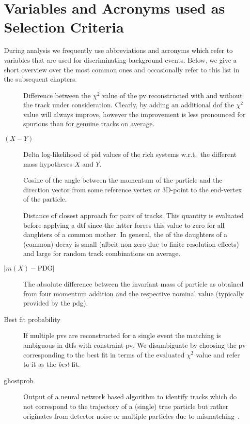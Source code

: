 \section{Variables and Acronyms used as Selection Criteria}
\label{sec:selvar}
During analysis we frequently use abbreviations and acronyms which refer to variables that are used for discriminating background events.
Below, we give a short overview over the most common ones and occasionally refer to this list in the subsequent chapters.
\begin{description}
    \item[\dchisqip] Difference between the $\chi^2$ value of the \gls{pv} reconstructed with and without the track under consideration. Clearly, by adding an additional \gls{dof} the $\chi^2$ value will always improve, however the improvement is less pronounced for spurious than for genuine tracks on average.
    \item[\dll$(X-Y)$] Delta log-likelihood of \gls{pid} values of the \gls{rich} systems w.r.t.\ the different mass hypotheses $X$ and $Y$.
    \item[\dira] Cosine of the angle between the momentum of the particle and the direction vector from some reference vertex or 3D-point to the end-vertex of the particle.
    \item[\doca] Distance of closest approach for pairs of tracks. This quantity is evaluated before applying a \gls{dtf} since the latter forces this value to zero for all daughters of a common mother. In general, the \doca{} of the daughters of a (common) decay is small (albeit non-zero due to finite resolution effects) and large for random track combinations on average.
    \item[$|m(X) - \text{PDG}|$] The absolute difference between the invariant mass of particle \PX as obtained from four momentum addition and the respective nominal value (typically provided by the \gls{pdg}).
    \item[Best fit probability] If multiple \glspl{pv} are reconstructed for a single event the matching is ambiguous in \glspl{dtf} with constraint \gls{pv}. We disambiguate by choosing the \gls{pv} corresponding to the best fit in terms of the evaluated $\chi^2$ value and refer to it as the \textit{best} fit.
    \item[\Gls{ghostprob}] Output of a neural network based algorithm to identify tracks which do not correspond to the trajectory of a (single) true particle but rather originates from detector noise or multiple particles due to mismatching~\cite{ghostprob}.
\end{description}
